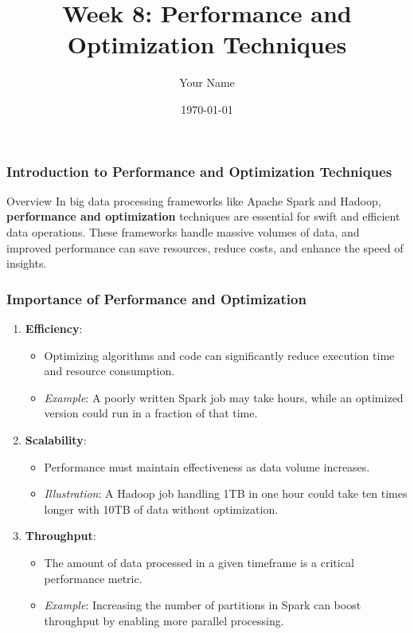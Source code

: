 \documentclass{beamer}
\title{Week 8: Performance and Optimization Techniques}
\author{Your Name}
\institute{Your Institution}
\date{\today}
\begin{document}
\frame{\titlepage}

\begin{frame}[fragile]
    \frametitle{Introduction to Performance and Optimization Techniques}
    \begin{block}{Overview}
        In big data processing frameworks like Apache Spark and Hadoop, \textbf{performance and optimization} techniques are essential for swift and efficient data operations. These frameworks handle massive volumes of data, and improved performance can save resources, reduce costs, and enhance the speed of insights.
    \end{block}
\end{frame}

\begin{frame}[fragile]
    \frametitle{Importance of Performance and Optimization}
    \begin{enumerate}
        \item \textbf{Efficiency}:
            \begin{itemize}
                \item Optimizing algorithms and code can significantly reduce execution time and resource consumption.
                \item \textit{Example}: A poorly written Spark job may take hours, while an optimized version could run in a fraction of that time.
            \end{itemize}
        \item \textbf{Scalability}:
            \begin{itemize}
                \item Performance must maintain effectiveness as data volume increases.
                \item \textit{Illustration}: A Hadoop job handling 1TB in one hour could take ten times longer with 10TB of data without optimization.
            \end{itemize}
        \item \textbf{Throughput}:
            \begin{itemize}
                \item The amount of data processed in a given timeframe is a critical performance metric.
                \item \textit{Example}: Increasing the number of partitions in Spark can boost throughput by enabling more parallel processing.
            \end{itemize}
    \end{enumerate}
\end{frame}
\end{document}
